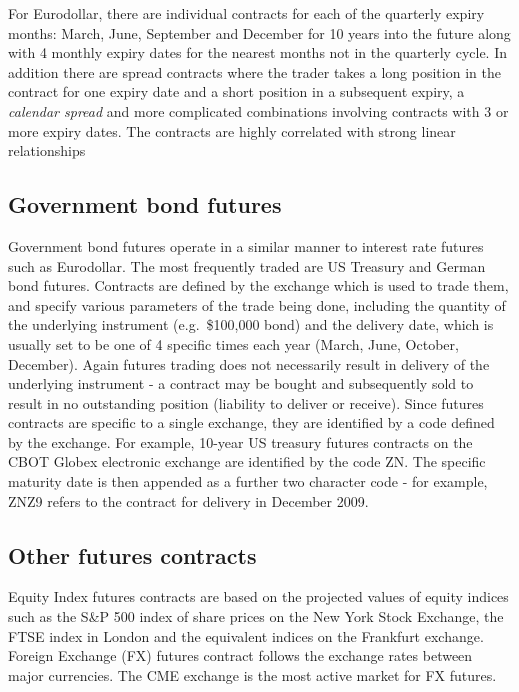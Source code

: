 For Eurodollar, there are individual contracts for each of the quarterly expiry months: March, June, September and December for 10 years into the future along with 4 monthly expiry dates for the nearest months not in the quarterly cycle. In addition there are spread contracts where the trader takes a long position in the contract for one expiry date and a short position in a subsequent expiry, a {\it calendar spread} and more complicated combinations involving contracts with 3 or more expiry dates. The contracts are highly correlated with strong linear relationships  {             

\subsection{Government bond futures}
Government bond futures operate in a similar manner to interest rate futures such as Eurodollar.  The most frequently traded are US Treasury and German bond futures. Contracts are defined by the exchange which is used to trade them, and specify various parameters of the trade being done, including the quantity of the underlying instrument (e.g.\ \$100,000 bond) and the delivery date, which is usually set to be one of 4 specific times each year (March, June, October, December). Again futures trading does not necessarily result in delivery of the underlying instrument - a contract may be bought and subsequently sold to result in no outstanding position (liability to deliver or receive). 
Since futures contracts are specific to a single exchange, they are identified by a code defined by the exchange.  For example, 10-year US treasury futures contracts on the CBOT Globex electronic exchange are identified by the code ZN.  The specific maturity date is then appended as a further two character code - for example, ZNZ9 refers to the contract for delivery in December 2009. 
\subsection{Other futures contracts}
Equity Index futures contracts are based on the projected values of equity indices such as the S\&P 500 index of share prices on the New York Stock Exchange, the FTSE index in London and the equivalent indices on the Frankfurt exchange. 
Foreign Exchange (FX) futures contract follows the exchange rates between major currencies.  The CME exchange is the most active market for FX futures. 
}

